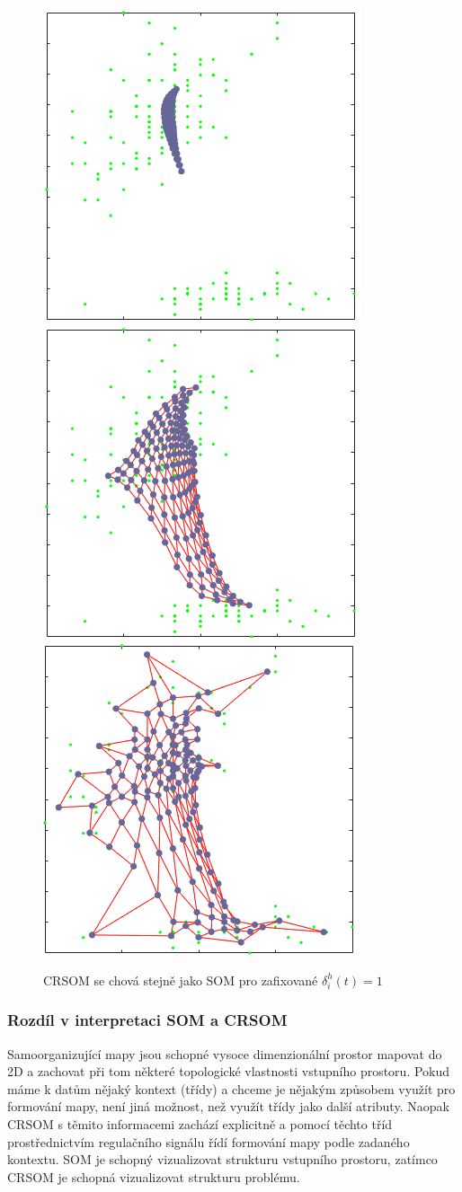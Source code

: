 \documentclass[thesis=M,czech]{FITthesis}[2012/06/26]
\begin{document}
\begin{figure}[htp]
    \centering
    
    \includegraphics[width=.32\textwidth]{s1.png}
    \includegraphics[width=.32\textwidth]{s2.png}
    \includegraphics[width=.32\textwidth]{s3.png}
    \caption{CRSOM se chová stejně jako SOM pro zafixované $ \delta_i^h(t) = 1 $ }
    \label{fig:delta_1}
\end{figure}


\subsubsection*{Rozdíl v interpretaci SOM a CRSOM}
Samoorganizující mapy jsou schopné vysoce dimenzionální prostor mapovat do 2D a zachovat při tom některé topologické vlastnosti vstupního prostoru. Pokud máme k datům nějaký kontext (třídy) a chceme je nějakým způsobem využít pro formování mapy, není jiná možnost, než využít třídy jako další atributy. Naopak CRSOM s těmito informacemi zachází explicitně a pomocí těchto tříd prostřednictvím regulačního signálu řídí formování mapy podle zadaného kontextu. SOM je schopný vizualizovat strukturu vstupního prostoru, zatímco CRSOM je schopná vizualizovat strukturu problému\cite{hartono14}.
\end{document}
